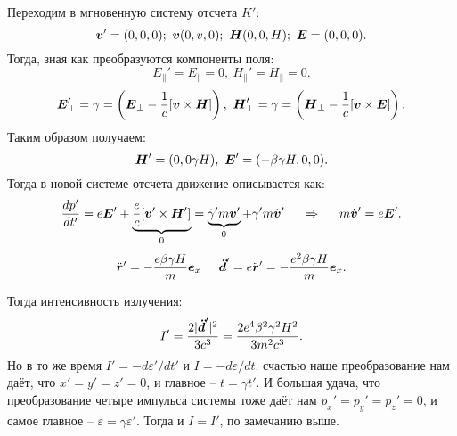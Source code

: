 Переходим в мгновенную систему отсчета $K'$:
\begin{equation*}
	\mbox{\boldmath $v$}'= (0,0,0); \ \mbox{\boldmath $v$}(0,v,0);
	\ \mbox{\boldmath $H$}(0,0,H); \ \mbox{\boldmath $E$} = (0,0,0).
\end{equation*}
Тогда, зная как преобразуются компоненты поля:
\begin{equation*}
	E_\parallel' = E_\parallel = 0, \
	H_\parallel' = H_\parallel = 0.
\end{equation*}
\begin{equation*}
	\vc{E}_\perp' = \gamma = \left(\vc{E}_\perp - \frac{1}{c}[\vc{v}\times \vc{H}]\right),
	\ 
	\vc{H}_\perp' = \gamma = \left(\vc{H}_\perp - \frac{1}{c}[\vc{v}\times \vc{E}]\right).
\end{equation*}
Таким образом получаем:
\begin{equation*}
	\mbox{\boldmath $H$}' = (0,0 \gamma H),
	\
	\mbox{\boldmath $E$}' = (- \beta\gamma H, 0,0).
\end{equation*}
Тогда в новой системе отсчета движение описывается как:
\begin{equation*}
	\frac{d p'}{d t'} = e \mbox{\boldmath $E$}' + \underbrace{\frac{e}{c}[\mbox{\boldmath $v$}' \times \mbox{\boldmath $H$}']}_{0} = \underbrace{\dot{\gamma}' m \mbox{\boldmath $v$}'}_{0} + \gamma' m \dot{\mbox{\boldmath $v$}}'
	\hspace{0.5 cm}
	\Rightarrow
	\hspace{0.5 cm}
	m \mbox{\boldmath $\dot{v}$}' = e \mbox{\boldmath $E$}'.
\end{equation*}
\begin{equation*}
	\ddot{\mbox{\boldmath $r$}}' = - \frac{e \beta \gamma H}{m} \mbox{\boldmath $e$}_x
	\hspace{0.5 cm}
	\mbox{\boldmath $\ddot{d}$}' = e \ddot{\mbox{\boldmath $r$}}' = - \frac{e^2 \beta \gamma H}{m} \mbox{\boldmath $e$}_x.
\end{equation*}


Тогда интенсивность излучения:
\begin{equation*}
	I' = \frac{2 |\mbox{\boldmath $\ddot{d}$}'|^2}{3 c^3} = \frac{2 e^4 \beta^2 \gamma^2 H^2}{3 m^2 c^3}.
\end{equation*}
Но в то же время $I' = - d\varepsilon' / d t'$  и $I = -d \varepsilon /d t$.
 счастью наше преобразование нам даёт, что $x'=y'=z'=0$, и главное -- $t = \gamma t'$.
 И большая удача, что преобразование четыре импульса системы тоже даёт нам $p_x'=p_y'=p_z'=0$, и самое главное -- $\varepsilon = \gamma \varepsilon'$.
 Тогда и $I = I'$, по замечанию выше.